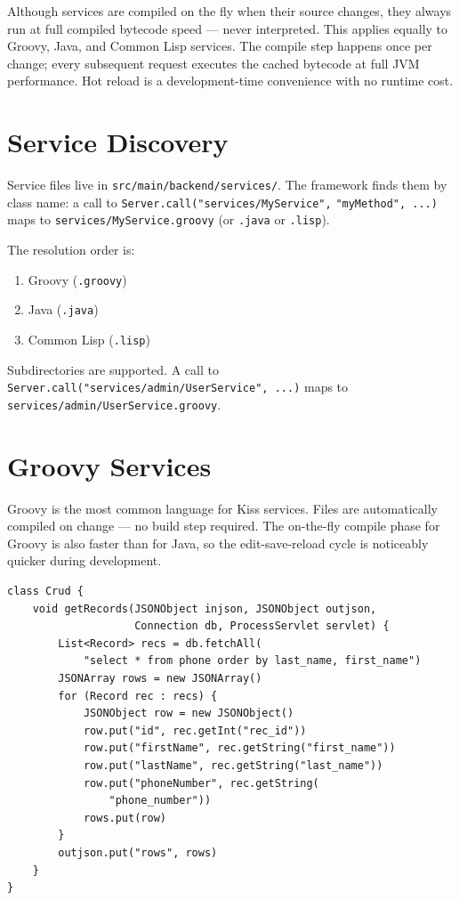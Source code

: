 \begin{notebox}
Although services are compiled on the fly when their source changes, they always run at full compiled bytecode speed --- never interpreted.  This applies equally to Groovy, Java, and Common Lisp services.  The compile step happens once per change; every subsequent request executes the cached bytecode at full JVM performance.  Hot reload is a development-time convenience with no runtime cost.
\end{notebox}

\section{Service Discovery}
\label{sec:svc-discovery}

Service files live in \texttt{src/main/backend/services/}.  The framework finds them by class name: a call to \texttt{Server.call("services/MyService",} \texttt{"myMethod", ...)} maps to \texttt{services/MyService.groovy} (or \texttt{.java} or \texttt{.lisp}).

The resolution order is:
\begin{enumerate}
  \item Groovy (\texttt{.groovy})
  \item Java (\texttt{.java})
  \item Common Lisp (\texttt{.lisp})
\end{enumerate}

\noindent
Subdirectories are supported.  A call to
\texttt{Server.call("services/\allowbreak{}admin/\allowbreak{}UserService", ...)} maps to
\texttt{services/admin/\allowbreak{}UserService.groovy}.

\section{Groovy Services}
\label{sec:svc-groovy}

Groovy is the most common language for Kiss services.  Files are automatically compiled on change --- no build step required.  The on-the-fly compile phase for Groovy is also faster than for Java, so the edit-save-reload cycle is noticeably quicker during development.

\begin{lstlisting}[style=groovy]
class Crud {
    void getRecords(JSONObject injson, JSONObject outjson,
                    Connection db, ProcessServlet servlet) {
        List<Record> recs = db.fetchAll(
            "select * from phone order by last_name, first_name")
        JSONArray rows = new JSONArray()
        for (Record rec : recs) {
            JSONObject row = new JSONObject()
            row.put("id", rec.getInt("rec_id"))
            row.put("firstName", rec.getString("first_name"))
            row.put("lastName", rec.getString("last_name"))
            row.put("phoneNumber", rec.getString(
                "phone_number"))
            rows.put(row)
        }
        outjson.put("rows", rows)
    }
}
\end{lstlisting}

